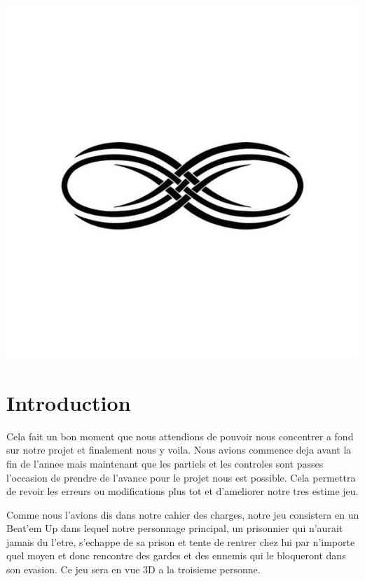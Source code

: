 \documentclass{article}
\begin{document}
\begin{center}
\includegraphics[scale=00.20]{infini}
\end{center}

\newpage
\thispagestyle{empty}
\tableofcontents

\newpage
\fontsize{12}{12}
\section{Introduction}

\par
Cela fait un bon moment que nous attendions de pouvoir nous concentrer a fond sur notre projet et finalement nous y voila. Nous avions commence deja avant la fin de l'annee mais maintenant que les partiels et les controles sont passes l'occasion de prendre de l'avance pour le projet nous est possible. Cela permettra de revoir les erreurs ou modifications plus tot et d'ameliorer notre tres estime jeu.
\newline

\par
Comme nous l'avions dis dans notre cahier des charges, notre jeu consistera en un Beat'em Up dans lequel notre personnage principal, un prisonnier qui n'aurait jamais du l'etre,  s'echappe de sa prison et tente de rentrer chez lui par n'importe quel moyen et donc rencontre des gardes et des ennemis  qui le bloqueront dans son evasion. Ce jeu sera en vue 3D a la troisieme personne.
\newline
\end{document}
